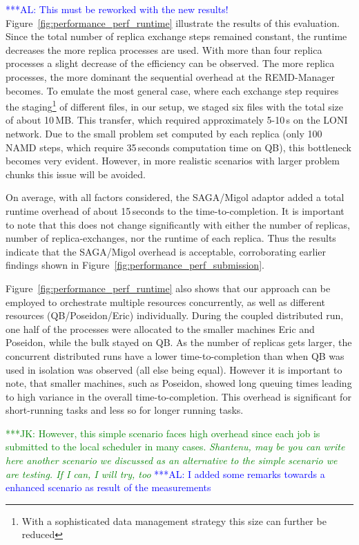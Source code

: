 \documentclass{rspublic}
\newcommand{\kimnote}[1]{ {\textcolor{green} { ***JK: #1 }}}
\newcommand{\alnote}[1]{ {\textcolor{blue} { ***AL: #1 }}}
\newcommand{\kimnote}[1]{}
\newcommand{\alnote}[1]{}
\begin{document}
\alnote{This must be reworked with the new results!}
Figure~\ref{fig:performance_perf_runtime} illustrate the results of
this evaluation. Since the total number of replica exchange steps
remained constant, the runtime decreases the more replica processes
are used.  With more than four replica processes a slight decrease of
the efficiency can be observed.
The more replica processes, the more dominant the sequential overhead
at the REMD-Manager becomes. To emulate the most general case, where
each exchange step requires the staging\footnote{With a sophisticated
  data management strategy this size can further be reduced} of
different files, in our setup, we staged six files with the total size
of about 10\,MB. This transfer, which required approximately 5-10\,s
on the LONI network.  Due to the small problem set computed by each
replica (only 100 NAMD steps, which require 35\,seconds computation
time on QB), this bottleneck becomes very evident. However, in more
realistic scenarios with larger problem chunks this issue will be
avoided.


On average, with all factors considered, the SAGA/Migol adaptor added
a total runtime overhead of about 15\,seconds to the
time-to-completion.  It is important to note that this does not change
significantly with either the number of replicas, number of
replica-exchanges, nor the runtime of each replica.  Thus the results
indicate that the SAGA/Migol overhead is acceptable, corroborating
earlier findings shown in
Figure~\ref{fig:performance_perf_submission}.

Figure~\ref{fig:performance_perf_runtime} also shows that our approach
can be employed to orchestrate multiple resources concurrently, as
well as different resources (QB/Poseidon/Eric) individually.  During
the coupled distributed run, one half of the processes were allocated to
the smaller machines Eric and Poseidon, while the bulk stayed on QB.  As the
number of replicas gets larger, the concurrent distributed runs have a
lower time-to-completion than when QB was used in isolation was
observed (all else being equal). However it is important to note, that
smaller machines, such as Poseidon, showed long queuing times leading
to high variance in the overall time-to-completion. This overhead is
significant for short-running tasks and less so for longer running
tasks. 

\kimnote{However, this simple scenario faces high overhead since each
  job is submitted to the local scheduler in many cases. \it Shantenu,
  may be you can write here another scenario we discussed as an
  alternative to the simple scenario we are testing.  If I can, I will
  try, too } \alnote{I added some remarks towards a enhanced scenario
  as result of the measurements}
  
\end{document}
